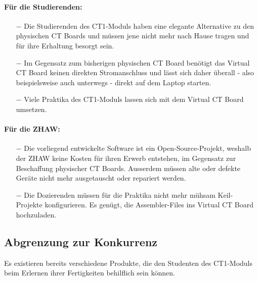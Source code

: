 \documentclass[10pt]{article}
\begin{document}
\paragraph{Für die Studierenden:}
\begin{itemize}
\item[$-$] Die Studierenden des CT1-Moduls haben eine elegante Alternative zu den physischen CT Boards und müssen jene nicht mehr nach Hause tragen und für ihre Erhaltung besorgt sein.
\item[$-$] Im Gegensatz zum bisherigen physischen CT Board benötigt das \glqq Virtual CT Board\grqq{} keinen direkten Stromanschluss und lässt sich daher überall - also beispielsweise auch unterwegs - direkt auf dem Laptop starten.
\item[$-$] Viele Praktika des CT1-Moduls lassen sich mit dem \glqq Virtual CT Board\grqq{} umsetzen.
\end{itemize}

\newpage
\paragraph{Für die ZHAW:}
\begin{itemize}
\item[$-$] Die vorliegend entwickelte Software ist ein Open-Source-Projekt, weshalb der ZHAW keine Kosten für ihren Erwerb entstehen, im Gegensatz zur Beschaffung physischer CT Boards. Ausserdem müssen alte oder defekte Geräte nicht mehr ausgetauscht oder repariert werden.
\item[$-$] Die Dozierenden müssen für die Praktika nicht mehr mühsam Keil-Projekte konfigurieren. Es genügt, die Assembler-Files ins \glqq Virtual CT Board\grqq{} hochzuladen.
\end{itemize}

\subsection{Abgrenzung zur Konkurrenz}

Es existieren bereits verschiedene Produkte, die den Studenten des CT1-Moduls beim Erlernen ihrer Fertigkeiten behilflich sein können.
\end{document}
